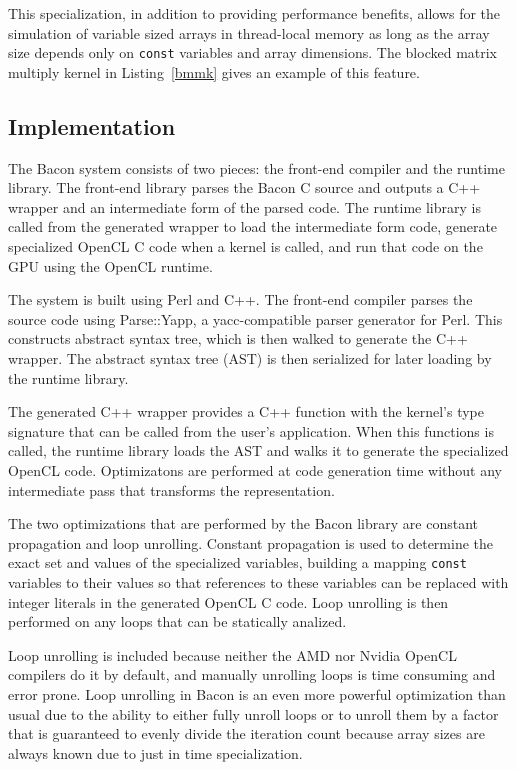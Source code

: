 \documentclass{llncs}
\begin{document}
This specialization, in addition to providing performance benefits,
allows for the simulation of variable sized arrays in thread-local
memory as long as the array size depends only on {\tt const} variables
and array dimensions. The blocked matrix multiply kernel in
Listing~\ref{bmmk} gives an example of this feature.

\subsection{Implementation}

The Bacon system consists of two pieces: the front-end compiler and the
runtime library. The front-end library parses the Bacon C source and
outputs a C++ wrapper and an intermediate form of the parsed code. The
runtime library is called from the generated wrapper to load the
intermediate form code, generate specialized OpenCL C code when a
kernel is called, and run that code on the GPU using the OpenCL
runtime.

The system is built using Perl and C++. The front-end compiler parses
the source code using Parse::Yapp, a yacc-compatible parser generator
for Perl. This constructs abstract syntax tree, which is then walked
to generate the C++ wrapper. The abstract syntax tree (AST) is then
serialized for later loading by the runtime library.

The generated C++ wrapper provides a C++ function with the kernel's
type signature that can be called from the user's application. When
this functions is called, the runtime library loads the AST and walks
it to generate the specialized OpenCL code. Optimizatons are performed
at code generation time without any intermediate pass that transforms
the representation.

The two optimizations that are performed by the Bacon library are
constant propagation and loop unrolling. Constant propagation is used
to determine the exact set and values of the specialized variables,
building a mapping {\tt const} variables to their values so that
references to these variables can be replaced with integer literals in
the generated OpenCL C code. Loop unrolling is then performed on any
loops that can be statically analized.

Loop unrolling is included because neither the AMD nor Nvidia OpenCL
compilers do it by default, and manually unrolling loops is time
consuming and error prone. Loop unrolling in Bacon is an even more
powerful optimization than usual due to the ability to either fully
unroll loops or to unroll them by a factor that is guaranteed to
evenly divide the iteration count because array sizes are always known
due to just in time specialization.
\end{document}
